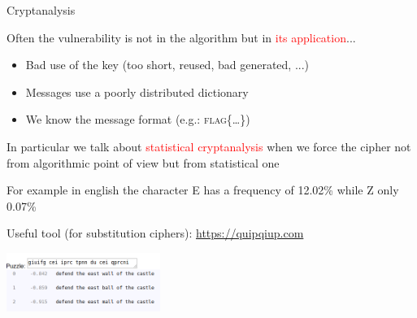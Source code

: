 \begin{frame}{Cryptanalysis}

Often the vulnerability is not in the algorithm but in \textcolor{red}{its application}...

\begin{itemize}
  \item Bad use of the key (too short, reused, bad generated, ...)
  \item Messages use a poorly distributed dictionary
  \item We know the message format (e.g.: \textsc{flag\{\ldots\}})
\end{itemize}

\medskip

In particular we talk about \textcolor{red}{statistical cryptanalysis} when we force the cipher not from algorithmic point of view but from statistical one

\medskip

For example in english the character E has a frequency of 12.02\% while Z only 0.07\%

\medskip

Useful tool (for substitution ciphers): \href{https://quipqiup.com}{https://quipqiup.com}

\medskip

\centering\includegraphics[width=5cm]{img/quipqiup.png}
  
\end{frame}


